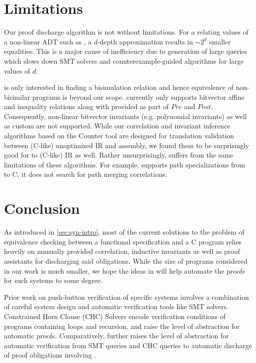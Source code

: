 \vspace{-12px}
\section{Limitations}
\vspace{-10px}
\label{sec:syn-limitations}
Our proof discharge algorithm is not without limitations.
For a \recursiveRelation{} relating values of a non-linear ADT such as , a $d$-depth
approximation results in $\sim 2^d$ smaller equalities. This is a major cause of inefficiency due to
generation of large queries which slows down SMT solvers and counterexample-guided algorithms for large values of $d$.

\toolName{} is only interested in finding a bisimulation relation and hence
equivalence of non-bisimilar programs is beyond our scope.
\toolName{} currently only supports bitvector affine and inequality relations
along with \recursiveRelations{} provided as part of $Pre$ and $Post$.
Consequently, non-linear bitvector invariants (e.g. polynomial invariants)
as well as custom \recursiveRelations{} are not supported.
While our correlation and invariant inference algorithms based on the Counter tool \cite{oopsla20}
are designed for translation validation between (C-like) unoptimized IR and assembly, we found them
to be surprisingly good for \SpecL{} to (C-like) IR as well. Rather unsurprisingly, \toolName{}
suffers from the same limitations of these algorithms. For example, \toolName{} supports path
specializations from \SpecL{} to C, it does not search for path merging correlations.
\vspace{-12px}
\section{Conclusion}
\vspace{-10px}
\label{sec:syn-conclusion}
As introduced in \cref{sec:syn-intro}, most of the current solutions
to the problem of equivalence checking between a functional specification
and a C program relies heavily on manually provided correlation, inductive
invariants as well as proof assistants for discharging said obligations.
While the size of programs considered in our work is much smaller,
we hope the ideas in \toolName{} will help
automate the proofs for such systems to some degree.

Prior work on push-button verification of specific
systems \cite{fscq,hyperkernel,serval,verifiedBPF}
involves a combination of careful system design and
automatic verification tools like SMT solvers.
Constrained Horn Clause (CHC) Solvers \cite{CHCeq}
encode verification conditions of programs containing loops and recursion,
and raise the level of abstraction for automatic proofs.
Comparatively, \toolName{} further raises the level
of abstraction for automatic verification from
SMT queries and CHC queries to automatic discharge of
proof obligations involving \recursiveRelations{}.

